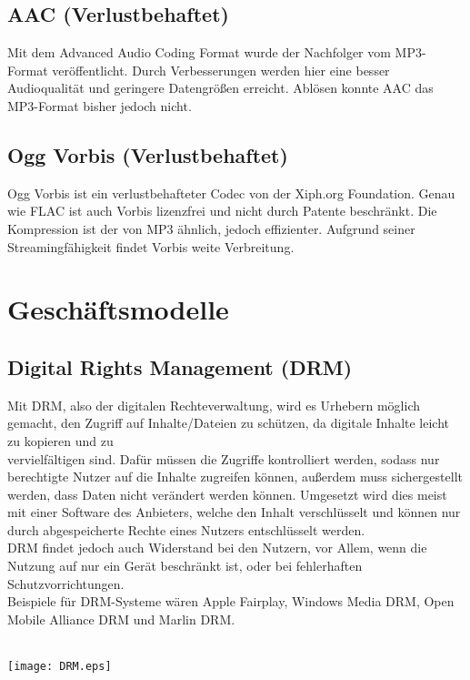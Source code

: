 \documentclass{extarticle}
\begin{document}
		\subsection{AAC (Verlustbehaftet)}
		Mit dem Advanced Audio Coding Format wurde der Nachfolger vom MP3-Format veröffentlicht. Durch Verbesserungen werden hier eine besser Audioqualität und geringere Datengrößen erreicht. Ablösen konnte AAC das MP3-Format bisher jedoch nicht. \cite{mp3aac}
		
		\subsection{Ogg Vorbis (Verlustbehaftet)}
		Ogg Vorbis ist ein verlustbehafteter Codec von der Xiph.org Foundation. Genau wie FLAC ist auch Vorbis lizenzfrei und nicht durch Patente beschränkt. Die Kompression ist der von MP3 ähnlich, jedoch effizienter. Aufgrund seiner Streamingfähigkeit findet Vorbis weite Verbreitung. \cite{vorbis}
		
		\section{Geschäftsmodelle}
		\subsection{Digital Rights Management (DRM)}
		Mit DRM, also der digitalen Rechteverwaltung, wird es Urhebern möglich gemacht, den Zugriff auf Inhalte/Dateien zu schützen, da digitale Inhalte leicht zu kopieren und zu \\ vervielfältigen sind. Dafür müssen die Zugriffe kontrolliert werden, sodass nur berechtigte Nutzer auf die Inhalte zugreifen können, außerdem muss sichergestellt werden, dass Daten nicht verändert werden können. Umgesetzt wird dies meist mit einer Software des Anbieters, welche den Inhalt verschlüsselt und können nur durch abgespeicherte Rechte eines Nutzers entschlüsselt werden. \\ 
		DRM findet jedoch auch Widerstand bei den Nutzern, vor Allem, wenn die Nutzung auf nur ein Gerät beschränkt ist, oder bei fehlerhaften Schutzvorrichtungen. \cite{drm} \cite{drmReport} \\
		Beispiele für DRM-Systeme wären Apple Fairplay, Windows Media DRM, Open Mobile Alliance DRM und Marlin DRM. \cite{drmsysteme} \\
		\\ \begin{center}\texttt{[image: DRM.eps]} \cite{drmKritik}\end{center}
		
\end{document}
